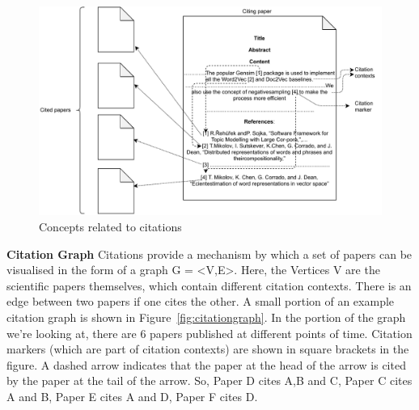 \begin{figure}
 \includegraphics[keepaspectratio, width=13cm]{figures/Background/citedcitingpaper.pdf}
  \caption{Concepts related to citations}
  \label{fig:citingcitedpaper}
\end{figure}

\textbf{Citation Graph}
Citations provide a mechanism by which a set of papers can be visualised in the form of a graph G = <V,E>. Here, the Vertices V are the scientific papers themselves, which contain different citation contexts. There is an edge between two papers if one cites the other. 
A small portion of an example citation graph is shown in Figure~\ref{fig:citationgraph}. In the portion of the graph we're looking at, there are 6 papers published at different points of time. Citation markers (which are part of citation contexts) are shown in square brackets in the figure. A dashed arrow indicates that the paper at the head of the arrow is cited by the paper at the tail of the arrow. So, Paper D cites A,B and C, Paper C cites A and B, Paper E cites A and D, Paper F cites D.

